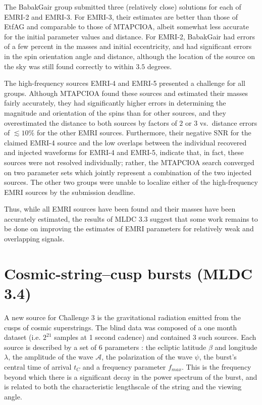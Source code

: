 \documentclass{iopart}
\begin{document}
The BabakGair group submitted three (relatively close) solutions for each of EMRI-2 and EMRI-3.  For EMRI-3, their estimates are better than those of EtfAG and comparable to those of MTAPCIOA, albeit somewhat less accurate for the initial parameter values and distance.  For EMRI-2, BabakGair had errors of a few percent in the masses and initial eccentricity, and had significant errors in the spin orientation angle and distance, although the location of the source on the sky was still found correctly to within $3.5$ degrees.

The high-frequency sources EMRI-4 and EMRI-5 presented a challenge for all groups.  Although MTAPCIOA found these sources and estimated their masses fairly accurately, they had significantly higher errors in determining the magnitude and orientation of the spins than for other sources, and they overestimated the distance to both sources by factors of $2$ or $3$ vs.~distance errors of $\lesssim 10\%$ for the other EMRI sources.  Furthermore, their negative SNR for the claimed EMRI-4 source and the low overlaps between the individual recovered and injected waveforms for EMRI-4 and EMRI-5, indicate that, in fact, these sources were not resolved individually; rather, the MTAPCIOA search converged on two parameter sets which jointly represent a combination of the two injected sources.   The other two groups were unable to localize either of the high-frequency EMRI sources by the submission deadline.

Thus, while all EMRI sources have been found and their masses have been accurately estimated, the results of MLDC 3.3 suggest that some work remains to be done on improving the estimates of EMRI parameters for relatively weak and overlapping signals.


\section{Cosmic-string--cusp bursts (MLDC 3.4)}

A new source for Challenge 3 is the gravitational radiation emitted from the cusps of cosmic superstrings.  The blind data was composed of a one month dataset (i.e. $2^{21}$ samples at 1 second cadence) and contained 3 such sources.  Each source is described
by a set of 6 parameters : the ecliptic latitude $\beta$ and longitude $\lambda$, the amplitude of the wave ${\mathcal A}$, the polarization of the wave $\psi$, the burst's
central time of arrival $t_C$ and a frequency parameter $f_{max}$.  This is the frequency beyond which there is a significant decay in the power spectrum of the burst, and is related to both the characteristic lengthscale of the string and the viewing angle.
\end{document}
